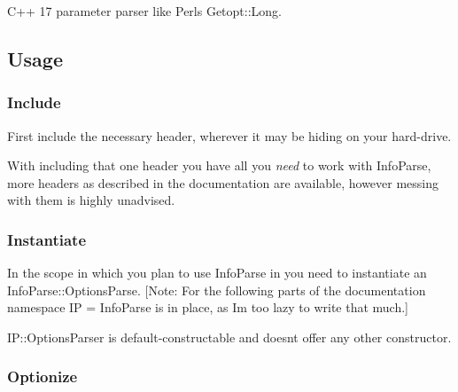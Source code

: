 C++ 17 parameter parser like Perl\textquotesingle{}s Getopt\+::\+Long.

\subsection*{Usage}

\subsubsection*{Include}

First include the necessary header, wherever it may be hiding on your hard-\/drive.
\begin{DoxyCode}{0}
\end{DoxyCode}
With including that one header you have all you {\itshape need} to work with Info\+Parse, more headers as described in the documentation are available, however messing with them is highly unadvised.

\subsubsection*{Instantiate}

In the scope in which you plan to use Info\+Parse in you need to instantiate an {\ttfamily Info\+Parse\+::\+Options\+Parse}. \mbox{[}Note\+: For the following parts of the documentation {\ttfamily namespace IP = Info\+Parse} is in place, as I\textquotesingle{}m too lazy to write that much.\mbox{]}
\begin{DoxyCode}{0}
\end{DoxyCode}
{\ttfamily I\+P\+::\+Options\+Parser} is default-\/constructable and doesn\textquotesingle{}t offer any other constructor.

\subsubsection*{Optionize}

